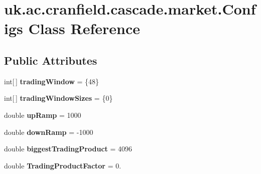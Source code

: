 \hypertarget{classuk_1_1ac_1_1cranfield_1_1cascade_1_1market_1_1_configs}{\section{uk.\-ac.\-cranfield.\-cascade.\-market.\-Configs Class Reference}
\label{classuk_1_1ac_1_1cranfield_1_1cascade_1_1market_1_1_configs}
}
\subsection*{Public Attributes}
\begin{DoxyCompactItemize}
\item 
\hypertarget{classuk_1_1ac_1_1cranfield_1_1cascade_1_1market_1_1_configs_adbbc1ab125e5af3b6cb8cd9eba7eb287}{int\mbox{[}$\,$\mbox{]} {\bfseries trading\-Window} = \{48\}}\label{classuk_1_1ac_1_1cranfield_1_1cascade_1_1market_1_1_configs_adbbc1ab125e5af3b6cb8cd9eba7eb287}

\item 
\hypertarget{classuk_1_1ac_1_1cranfield_1_1cascade_1_1market_1_1_configs_a74e17053882fd8e6905582b994c21c72}{int\mbox{[}$\,$\mbox{]} {\bfseries trading\-Window\-Sizes} = \{0\}}\label{classuk_1_1ac_1_1cranfield_1_1cascade_1_1market_1_1_configs_a74e17053882fd8e6905582b994c21c72}

\item 
\hypertarget{classuk_1_1ac_1_1cranfield_1_1cascade_1_1market_1_1_configs_a2af1831d1202041f1961e4257791a1b9}{double {\bfseries up\-Ramp} = 1000}\label{classuk_1_1ac_1_1cranfield_1_1cascade_1_1market_1_1_configs_a2af1831d1202041f1961e4257791a1b9}

\item 
\hypertarget{classuk_1_1ac_1_1cranfield_1_1cascade_1_1market_1_1_configs_af91415c3f2b41030eae559efa541dbfd}{double {\bfseries down\-Ramp} = -\/1000}\label{classuk_1_1ac_1_1cranfield_1_1cascade_1_1market_1_1_configs_af91415c3f2b41030eae559efa541dbfd}

\item 
\hypertarget{classuk_1_1ac_1_1cranfield_1_1cascade_1_1market_1_1_configs_a13411079ffc9d6f5a0ac568947c88e59}{double {\bfseries biggest\-Trading\-Product} = 4096}\label{classuk_1_1ac_1_1cranfield_1_1cascade_1_1market_1_1_configs_a13411079ffc9d6f5a0ac568947c88e59}

\item 
\hypertarget{classuk_1_1ac_1_1cranfield_1_1cascade_1_1market_1_1_configs_a89e99f2a7029d9b9751ecaed80accd7e}{double {\bfseries Trading\-Product\-Factor} = 0.}\label{classuk_1_1ac_1_1cranfield_1_1cascade_1_1market_1_1_configs_a89e99f2a7029d9b9751ecaed80accd7e}


\end{DoxyCompactItemize}
